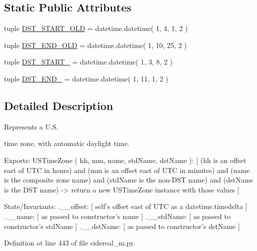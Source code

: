 \subsection*{Static Public Attributes}
\begin{DoxyCompactItemize}
\item 
tuple \hyperlink{classsidereal__m_1_1_u_s_time_zone_a41cb20c9dbc1698a3b8a86320954b021}{D\-S\-T\-\_\-\-S\-T\-A\-R\-T\-\_\-\-O\-L\-D} = datetime.\-datetime( 1, 4, 1, 2 )
\item 
tuple \hyperlink{classsidereal__m_1_1_u_s_time_zone_a554202ecc84ef01c660b7b710bbc8516}{D\-S\-T\-\_\-\-E\-N\-D\-\_\-\-O\-L\-D} = datetime.\-datetime( 1, 10, 25, 2 )
\item 
tuple \hyperlink{classsidereal__m_1_1_u_s_time_zone_af47f8086731af5141d70e129f783bd2d}{D\-S\-T\-\_\-\-S\-T\-A\-R\-T\-\_} = datetime.\-datetime( 1, 3, 8, 2 )
\item 
tuple \hyperlink{classsidereal__m_1_1_u_s_time_zone_a0e6a05ecb7c04617f48bd6e60b7ea2fa}{D\-S\-T\-\_\-\-E\-N\-D\-\_} = datetime.\-datetime( 1, 11, 1, 2 )
\end{DoxyCompactItemize}


\subsection{Detailed Description}
Represents a U.\-S. 

time zone, with automatic daylight time. \begin{DoxyVerb}  Exports:
    USTimeZone ( hh, mm, name, stdName, dstName ):
      [ (hh is an offset east of UTC in hours) and
        (mm is an offset east of UTC in minutes) and
        (name is the composite zone name) and
        (stdName is the non-DST name) and
        (dstName is the DST name) ->
          return a new USTimeZone instance with those values ]

  State/Invariants:
    .__offset:
      [ self's offset east of UTC as a datetime.timedelta ]
    .__name:      [ as passed to constructor's name ]
    .__stdName:   [ as passed to constructor's stdName ]
    .__dstName:   [ as passed to constructor's dstName ]\end{DoxyVerb}
 

Definition at line 443 of file sidereal\-\_\-m.\-py.



